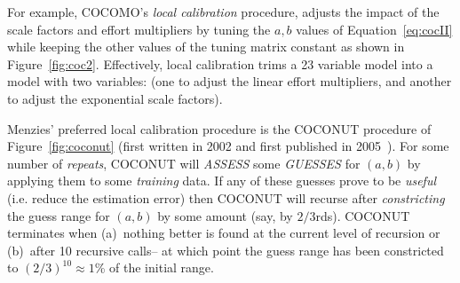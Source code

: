 \documentclass[smallcondesed]{svjour3}
\newcommand{\fig}[1]{Figure~\ref{fig:#1}}
\begin{document}
For example,
 COCOMO's   {\em local calibration} procedure, adjusts the impact of the scale factors and effort
multipliers by tuning the  $a,b$ values of Equation~\ref{eq:cocII}
while keeping the other values of the tuning matrix constant as
shown in \fig{coc2}. Effectively, local calibration trims
a 23 variable model
into a model with two variables: (one  to adjust the linear effort
multipliers, and another to adjust the exponential scale factors).

Menzies' preferred local calibration procedure is the COCONUT
procedure of \fig{coconut} (first written in 2002
and first published in 2005~\cite{me04h}). 
For some number of {\em repeats},
COCONUT will {\em ASSESS} some {\em GUESSES} 
 for $(a,b)$ by applying them to some
{\em training} data. If any of these guesses prove to
be {\em useful} (i.e. reduce the estimation error) then COCONUT will recurse after
{\em constricting} the guess range for $(a,b)$ by some amount (say, by $2/3$rds). COCONUT terminates
when (a)~nothing better is found at the current level of recursion
or (b)~after 10 recursive calls-- at which point the guess range
has been constricted to  $(2/3)^{10}\approx 1$\% of the initial range.

 
\end{document}
